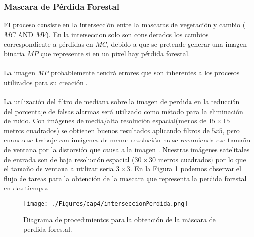 \subsubsection{Mascara de P\'erdida Forestal}
El proceso consiste en la intersecci\'on entre la mascaras de vegetaci\'on y cambio ($ MC$ AND $MV $). En la interseccion solo son considerados los cambios correspondiente a p\'erdidas en $ MC $, debido a que se pretende generar una imagen binaria $ MP $ que represente si en un pixel hay p\'erdida forestal.\\~\\
La imagen $ MP $ probablemente tendr\'a errores que son inherentes a los procesos utilizados para su creación \cite{lovell2001filtering}. \\~\\
La utilizaci\'on del filtro de mediana sobre la imagen de perdida en la reducci\'on del porcentaje de falsas alarmas ser\'a utilizado como m\'etodo para la eliminaci\'on de ruido. Con im\'agenes de media/alta resoluci\'on espacial(menos de $ 15 \times 15 $ metros cuadrados) se obtienen buenos resultados aplicando filtros de $ 5x5 $, pero cuando se trabaje con im\'agenes de menor resoluci\'on no se recomienda ese tama\~{n}o de ventana por la distorsi\'on que causa a la imagen \cite{martinez2013normalizacion}. Nuestras im\'agenes satelitales de entrada son de baja resoluci\'on espacial ($ 30 \times 30 $ metros cuadrados) por lo que el tama\~{n}o de ventana a utilizar seria $ 3 \times 3 $.
En la Figura \ref{fig:intersPerdida} podemos observar el flujo de tareas para la obtenci\'on de la mascara que representa la perdida forestal en dos tiempos .
\begin{figure}[H]
	\centering
	\texttt{[image: ./Figures/cap4/interseccionPerdida.png]}
	\caption{Diagrama de procedimientos para la obtenci\'on de la m\'ascara de perdida forestal.}
	\label{fig:intersPerdida}
\end{figure}


